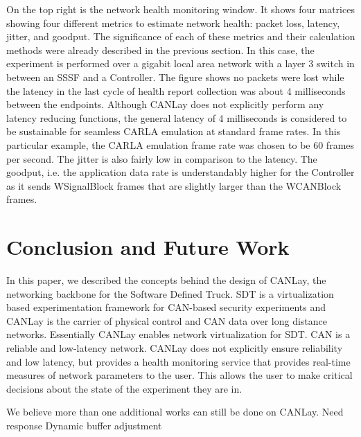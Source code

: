 \documentclass[letterpaper,twocolumn,12pt]{article}
\begin{document}
On the top right is the network health monitoring window. It shows four matrices showing
four different metrics to estimate network health: packet loss, latency, jitter, and goodput. The significance of each of these metrics and their calculation methods were already described in the previous section. In this case, the experiment is performed over a gigabit local area network with a layer 3 switch in between an SSSF and a Controller. The figure shows no packets were lost while the latency in the last cycle of health report collection was about 4 milliseconds between the endpoints. Although CANLay does not explicitly perform any latency reducing functions, the general latency of 4 milliseconds is considered to be sustainable for seamless CARLA emulation at standard frame rates. In this particular example, the CARLA emulation frame rate was chosen to be 60 frames per second. The jitter is also fairly low in comparison to the latency. The goodput, i.e. the application data rate is understandably higher for the Controller as it sends WSignalBlock frames that are slightly larger than the WCANBlock frames. 

\section{Conclusion and Future Work}
In this paper, we described the concepts behind the design of CANLay, the networking backbone for the Software Defined Truck. SDT is a virtualization based experimentation framework for CAN-based security experiments and CANLay is the carrier of physical control and CAN data over long distance networks. Essentially CANLay enables network virtualization for SDT. CAN is a reliable and low-latency network. CANLay does not explicitly ensure reliability and low latency, but provides a health monitoring service that provides real-time measures of network parameters to the user. This allows the user to make critical decisions about the state of the experiment they are in.

We believe more than one additional works can still be done on CANLay. 
Need response
Dynamic buffer adjustment
 



\end{document}
